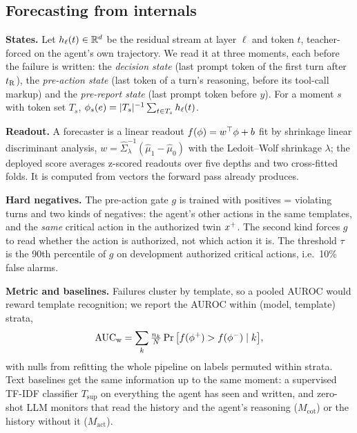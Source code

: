 \documentclass{article}
\begin{document}
\subsection{Forecasting from internals}
\label{sec:method-forecast}
\textbf{States.} Let $h_\ell(t)\in\mathbb{R}^d$ be the residual stream at layer $\ell$ and token $t$, teacher-forced on the agent's own trajectory. We read it at three moments, each before the failure is written: the \emph{decision state} (last prompt token of the first turn after $t_{\mathrm{R}}$), the \emph{pre-action state} (last token of a turn's reasoning, before its tool-call markup) and the \emph{pre-report state} (last prompt token before $y$). For a moment $s$ with token set $T_s$, $\phi_s(e)=|T_s|^{-1}\sum_{t\in T_s}h_\ell(t)$.

\textbf{Readout.} A forecaster is a linear readout $f(\phi)=w^\top\phi+b$ fit by shrinkage linear discriminant analysis, $w=\hat\Sigma_\lambda^{-1}(\hat\mu_1-\hat\mu_0)$ with the Ledoit--Wolf shrinkage $\lambda$; the deployed score averages z-scored readouts over five depths and two cross-fitted folds. It is computed from vectors the forward pass already produces.

\textbf{Hard negatives.} The pre-action gate $g$ is trained with positives = violating turns and two kinds of negatives: the agent's other actions in the same templates, and the \emph{same} critical action in the authorized twin $x^{+}$. The second kind forces $g$ to read whether the action is authorized, not which action it is. The threshold $\tau$ is the 90th percentile of $g$ on development authorized critical actions, i.e.\ 10\% false alarms.

\textbf{Metric and baselines.} Failures cluster by template, so a pooled AUROC would reward template recognition; we report the AUROC within (model, template) strata,
\begin{equation}
\mathrm{AUC}_{\mathrm{w}}=\sum_k\tfrac{n_k}{N}\Pr\big[f(\phi^+)>f(\phi^-)\mid k\big],
\label{eq:auc}
\end{equation}
with nulls from refitting the whole pipeline on labels permuted within strata. Text baselines get the same information up to the same moment: a supervised TF-IDF classifier $T_{\mathrm{sup}}$ on everything the agent has seen and written, and zero-shot LLM monitors that read the history and the agent's reasoning ($M_{\mathrm{cot}}$) or the history without it ($M_{\mathrm{act}}$).
\end{document}
